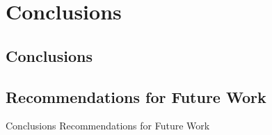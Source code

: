 \chapter{Conclusions} 

\label{Chapter7} 


\doublespacing


\section{Conclusions}

\section{Recommendations for Future Work}

Conclusions
Recommendations for Future Work

